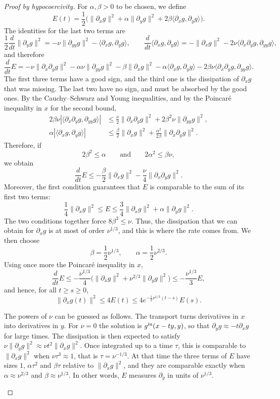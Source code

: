 \documentclass[11pt]{article}
\makeatletter
\theoremstyle{definition}
\theoremstyle{remark}
\newenvironment{note}[1][Note]{\begin{tcolorbox}[ed@note]\noindent{\itshape#1\@addpunct{.}}\enspace\ignorespaces}{\end{tcolorbox}}
\makeatother
\begin{document}
\begin{proof}[Proof by hypocoercivity]
For $\alpha,\beta>0$ to be chosen, we define
\[E(t)=\frac12\Big(\|\partial_xg\|^2+\alpha\|\partial_yg\|^2+2\beta\langle\partial_xg,\partial_yg\rangle\Big).\]
The identities for the last two terms are
\[\frac12\frac{d}{dt}\|\partial_yg\|^2=-\nu\|\partial_{yy}g\|^2-\langle\partial_xg,\partial_yg\rangle,\qquad\frac{d}{dt}\langle\partial_xg,\partial_yg\rangle=-\|\partial_xg\|^2-2\nu\langle\partial_x\partial_yg,\partial_{yy}g\rangle,\]
and therefore
\[\frac{d}{dt}E=-\nu\|\partial_x\partial_yg\|^2-\alpha\nu\|\partial_{yy}g\|^2-\beta\|\partial_xg\|^2-\alpha\langle\partial_xg,\partial_yg\rangle-2\beta\nu\langle\partial_x\partial_yg,\partial_{yy}g\rangle.\]
The first three terms have a good sign, and the third one is the dissipation of $\partial_xg$ that was missing. The last two have no sign, and must be absorbed by the good ones. By the Cauchy–Schwarz and Young inequalities, and by the Poincaré inequality in $x$ for the second bound,
\[\begin{aligned}2\beta\nu|\langle\partial_x\partial_yg,\partial_{yy}g\rangle|&\leq\frac{\nu}{2}\|\partial_x\partial_yg\|^2+2\beta^2\nu\|\partial_{yy}g\|^2,\\\alpha|\langle\partial_xg,\partial_yg\rangle|&\leq\frac{\beta}{2}\|\partial_xg\|^2+\frac{\alpha^2}{2\beta}\|\partial_x\partial_yg\|^2.\end{aligned}\]
Therefore, if
\[2\beta^2\leq\alpha\qquad\text{and}\qquad2\alpha^2\leq\beta\nu,\]
we obtain
\[\frac{d}{dt}E\leq-\frac{\beta}{2}\|\partial_xg\|^2-\frac{\nu}{4}\|\partial_x\partial_yg\|^2.\]
Moreover, the first condition guarantees that $E$ is comparable to the sum of its first two terms:
\[\frac14\|\partial_xg\|^2\leq E\leq\frac34\|\partial_xg\|^2+\alpha\|\partial_yg\|^2.\]
The two conditions together force $8\beta^3\leq\nu$. Thus, the dissipation that we can obtain for $\partial_xg$ is at most of order $\nu^{1/3}$, and this is where the rate comes from. We then choose
\[\beta=\frac12\nu^{1/3},\qquad\alpha=\frac12\nu^{2/3}.\]
Using once more the Poincaré inequality in $x$,
\[\frac{d}{dt}E\leq-\frac{\nu^{1/3}}{4}\Big(\|\partial_xg\|^2+\nu^{2/3}\|\partial_yg\|^2\Big)\leq-\frac{\nu^{1/3}}{3}E,\]
and hence, for all $t\geq s\geq0$,
\[\|\partial_xg(t)\|^2\leq4E(t)\leq4e^{-\frac13\nu^{1/3}(t-s)}E(s).\]
\begin{note}[The choice of the coefficients]
The powers of $\nu$ can be guessed as follows. The transport turns derivatives in $x$ into derivatives in $y$. For $\nu=0$ the solution is $g^{\rm in}(x-ty,y)$, so that $\partial_yg\approx-t\partial_xg$ for large times. The dissipation is then expected to satisfy $\nu\|\partial_yg\|^2\approx\nu t^2\|\partial_xg\|^2$. Once integrated up to a time $\tau$, this is comparable to $\|\partial_xg\|^2$ when $\nu\tau^3\approx1$, that is $\tau=\nu^{-1/3}$. At that time the three terms of $E$ have sizes $1$, $\alpha\tau^2$ and $\beta\tau$ relative to $\|\partial_xg\|^2$, and they are comparable exactly when $\alpha\approx\nu^{2/3}$ and $\beta\approx\nu^{1/3}$. In other words, $E$ measures $\partial_y$ in units of $\nu^{1/3}$.

\end{note}
\end{proof}
\end{document}
